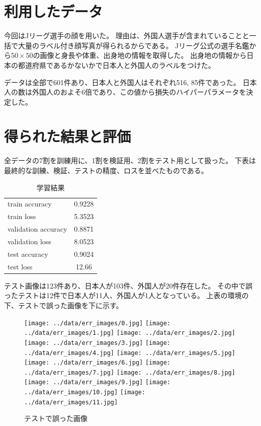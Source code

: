 \documentclass[uplatex]{jsarticle}
\begin{document}
\section{利用したデータ}
今回はJリーグ選手の顔を用いた。
理由は、外国人選手が含まれていることと一括で大量のラベル付き顔写真が得られるからである。
Jリーグ公式の選手名鑑から$50\times50$の画像と身長や体重、出身地の情報を取得した。
出身地の情報から日本の都道府県であるかないかで日本人と外国人のラベルをつけた。

データは全部で601件あり、日本人と外国人はそれぞれ516, 85件であった。
日本人の数は外国人のおよそ6倍であり、この値から損失のハイパーパラメータを決定した。


\section{得られた結果と評価}
全データの7割を訓練用に、1割を検証用、2割をテスト用として扱った。
下表は最終的な訓練、検証、テストの精度、ロスを並べたものである。

\begin{table}[H]
  \caption{学習結果}
  \begin{center}
    \begin{tabular}{lc} \hline
      train accuracy & 0.9228 \\
      train loss & 5.3523 \\
      validation accuracy & 0.8871 \\
      validation loss & 8.0523 \\
      test accuracy & 0.9024 \\
      test loss & 12.66 \\ \hline
    \end{tabular}
  \end{center}
\end{table}

テスト画像は123件あり、日本人が103件、外国人が20件存在した。
その中で誤ったテストは12件で日本人が11人、外国人が1人となっている。
上表の環境の下、テストで誤った画像を下に示す。

\begin{figure}[H]
  \begin{center}
    \texttt{[image: ../data/err\_images/0.jpg]}
    \texttt{[image: ../data/err\_images/1.jpg]}
    \texttt{[image: ../data/err\_images/2.jpg]}
    \texttt{[image: ../data/err\_images/3.jpg]}
    \texttt{[image: ../data/err\_images/4.jpg]}
    \texttt{[image: ../data/err\_images/5.jpg]}
    \\
    \texttt{[image: ../data/err\_images/6.jpg]}
    \texttt{[image: ../data/err\_images/7.jpg]}
    \texttt{[image: ../data/err\_images/8.jpg]}
    \texttt{[image: ../data/err\_images/9.jpg]}
    \texttt{[image: ../data/err\_images/10.jpg]}
    \texttt{[image: ../data/err\_images/11.jpg]}
    \caption{テストで誤った画像}
  \end{center}
\end{figure}
\end{document}
